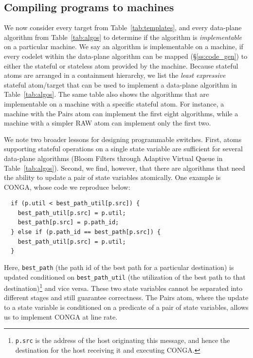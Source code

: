 

\subsection{Compiling \pktlanguage programs to \absmachine machines}
\label{ss:compiler}
We now consider every target from Table~\ref{tab:templates}, and every
data-plane algorithm from Table~\ref{tab:algos} to determine if the algorithm
is \textit{implementable} on a particular \absmachine machine. We say an
algorithm is implementable on a \absmachine machine, if every codelet within
the data-plane algorithm can be mapped (\S\ref{ss:code_gen}) to either the
stateful or stateless atom provided by the \absmachine machine. Because
stateful atoms are arranged in a containment hierarchy, we list the
\textit{least expressive} stateful atom/target that can be used to implement a
data-plane algorithm in Table~\ref{tab:algos}. The same table also shows the
algorithms that are implementable on a \absmachine machine with a specific
stateful atom. For instance, a \absmachine machine with the Pairs atom can
implement the first eight algorithms, while a machine with a simpler RAW atom
can implement only the first two.

We note two broader lessons for designing programmable switches.  First,
atoms supporting stateful operations on a single state variable are sufficient
for several data-plane algorithms (Bloom Filters through Adaptive Virtual Queue
in Table~\ref{tab:algos}). Second, we find, however, that there are algorithms
that need the ability to update a pair of state variables atomically. One
example is CONGA, whose code we reproduce below:
\begin{verbatim}
  if (p.util < best_path_util[p.src]) {
    best_path_util[p.src] = p.util;
    best_path[p.src] = p.path_id;
  } else if (p.path_id == best_path[p.src]) {
    best_path_util[p.src] = p.util;
  }
\end{verbatim}
Here, \texttt{best\_path} (the path id of the best path for a particular
destination) is updated conditioned on \texttt{best\_path\_util} (the
utilization of the best path to that destination)\footnote{{\tt p.src} is the
  address of the host originating this message, and hence the destination for
the host receiving it and executing CONGA.} and vice versa. These two state
variables cannot be separated into different stages and still guarantee
correctness. The Pairs atom, where the update to a state variable is
conditioned on a predicate of a pair of state variables, allows us to implement
CONGA at line rate.

